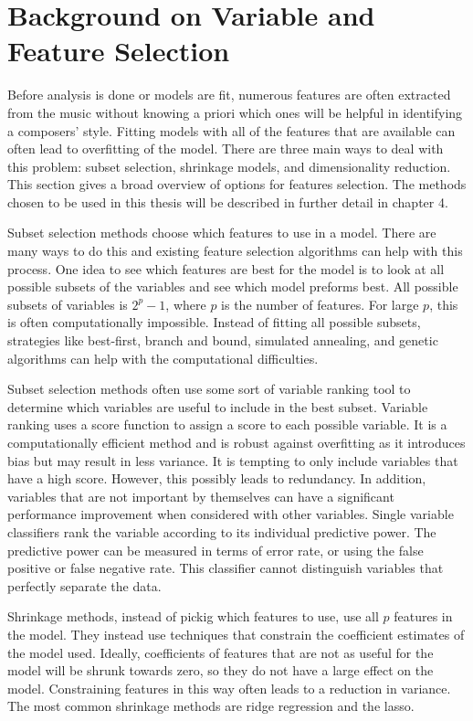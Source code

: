 \documentclass[12pt,twoside]{reedthesis}
\theoremstyle{definition}
\theoremstyle{definition}
\theoremstyle{definition}
\theoremstyle{remark}
\begin{document}
\section{Background on Variable and Feature
Selection}\label{background-on-variable-and-feature-selection}

Before analysis is done or models are fit, numerous features are often
extracted from the music without knowing a priori which ones will be
helpful in identifying a composers' style. Fitting models with all of
the features that are available can often lead to overfitting of the
model. There are three main ways to deal with this problem: subset
selection, shrinkage models, and dimensionality reduction. This section
gives a broad overview of options for features selection. The methods
chosen to be used in this thesis will be described in further detail in
chapter 4.

Subset selection methods choose which features to use in a model. There
are many ways to do this and existing feature selection algorithms can
help with this process. One idea to see which features are best for the
model is to look at all possible subsets of the variables and see which
model preforms best. All possible subsets of variables is \(2^p-1\),
where \(p\) is the number of features. For large \(p\), this is often
computationally impossible. Instead of fitting all possible subsets,
strategies like best-first, branch and bound, simulated annealing, and
genetic algorithms can help with the computational difficulties.

Subset selection methods often use some sort of variable ranking tool to
determine which variables are useful to include in the best subset.
Variable ranking uses a score function to assign a score to each
possible variable. It is a computationally efficient method and is
robust against overfitting as it introduces bias but may result in less
variance. It is tempting to only include variables that have a high
score. However, this possibly leads to redundancy. In addition,
variables that are not important by themselves can have a significant
performance improvement when considered with other variables. Single
variable classifiers rank the variable according to its individual
predictive power. The predictive power can be measured in terms of error
rate, or using the false positive or false negative rate. This
classifier cannot distinguish variables that perfectly separate the
data.

Shrinkage methods, instead of pickig which features to use, use all
\(p\) features in the model. They instead use techniques that constrain
the coefficient estimates of the model used. Ideally, coefficients of
features that are not as useful for the model will be shrunk towards
zero, so they do not have a large effect on the model. Constraining
features in this way often leads to a reduction in variance. The most
common shrinkage methods are ridge regression and the lasso.
\end{document}
